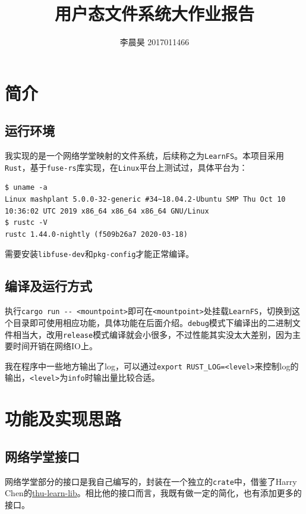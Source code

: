 \documentclass[12pt, UTF8]{article}
\title{用户态文件系统大作业报告}
\author{李晨昊 2017011466}
\begin{document}
\maketitle
\tableofcontents

\section{简介}

\subsection{运行环境}

我实现的是一个网络学堂映射的文件系统，后续称之为\lstinline|LearnFS|。本项目采用\lstinline|Rust|，基于\lstinline|fuse-rs|库实现，在\lstinline|Linux|平台上测试过，具体平台为：

\begin{lstlisting}[language = {}]
$ uname -a
Linux mashplant 5.0.0-32-generic #34~18.04.2-Ubuntu SMP Thu Oct 10 10:36:02 UTC 2019 x86_64 x86_64 x86_64 GNU/Linux
$ rustc -V
rustc 1.44.0-nightly (f509b26a7 2020-03-18)
\end{lstlisting}

需要安装\lstinline|libfuse-dev|和\lstinline|pkg-config|才能正常编译。

\subsection{编译及运行方式}

执行\lstinline|cargo run -- <mountpoint>|即可在\lstinline|<mountpoint>|处挂载\lstinline|LearnFS|，切换到这个目录即可使用相应功能，具体功能在后面介绍。\lstinline|debug|模式下编译出的二进制文件相当大，改用\lstinline|release|模式编译就会小很多，不过性能其实没太大差别，因为主要时间开销在网络IO上。

我在程序中一些地方输出了log，可以通过\lstinline|export RUST_LOG=<level>|来控制log的输出，\lstinline|<level>|为\lstinline|info|时输出量比较合适。

\section{功能及实现思路}

\subsection{网络学堂接口}

网络学堂部分的接口是我自己编写的，封装在一个独立的\lstinline|crate|中，借鉴了Harry Chen的\href{https://github.com/Harry-Chen/thu-learn-lib}{thu-learn-lib}。相比他的接口而言，我既有做一定的简化，也有添加更多的接口。
\end{document}
